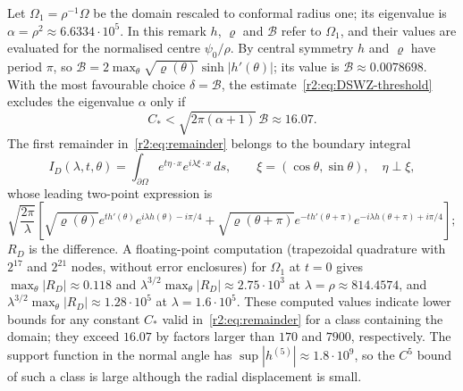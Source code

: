 \begin{remark}\label{r2:rem:stationary}
Let $\Omega_1=\rho^{-1}\Omega$ be the domain rescaled to conformal radius one; its eigenvalue is $\alpha=\rho^2\approx6.6334\cdot10^5$. In this remark $h$, $\varrho$ and $\mathcal B$ refer to $\Omega_1$, and their values are evaluated for the normalised centre $\psi_0/\rho$. By central symmetry $h$ and $\varrho$ have period $\pi$, so $\mathcal B=2\max_\theta\sqrt{\varrho(\theta)}\sinh|h'(\theta)|$; its value is $\mathcal B\approx0.0078698$. With the most favourable choice $\delta=\mathcal B$, the estimate~\eqref{r2:eq:DSWZ-threshold} excludes the eigenvalue $\alpha$ only if
\[
 C_*<\sqrt{2\pi(\alpha+1)}\,\mathcal B\approx16.07.
\]
The first remainder in~\eqref{r2:eq:remainder} belongs to the boundary integral
\[
 I_D(\lambda,t,\theta)
 =\int_{\partial\Omega}e^{t\eta\cdot x}e^{i\lambda\xi\cdot x}\,ds,
 \qquad\xi=(\cos\theta,\sin\theta),\quad\eta\perp\xi,
\]
whose leading two-point expression is
\[
 \sqrt{\frac{2\pi}{\lambda}}\left[
 \sqrt{\varrho(\theta)}e^{t h'(\theta)}e^{i\lambda h(\theta)-i\pi/4}
 +\sqrt{\varrho(\theta+\pi)}e^{-t h'(\theta+\pi)}
 e^{-i\lambda h(\theta+\pi)+i\pi/4}\right];
\]
$R_D$ is the difference. A floating-point computation (trapezoidal quadrature with $2^{17}$ and $2^{21}$ nodes, without error enclosures) for $\Omega_1$ at $t=0$ gives $\max_\theta|R_D|\approx0.118$ and $\lambda^{3/2}\max_\theta|R_D|\approx2.75\cdot10^3$ at $\lambda=\rho\approx814.4574$, and $\lambda^{3/2}\max_\theta|R_D|\approx1.28\cdot10^5$ at $\lambda=1.6\cdot10^5$. These computed values indicate lower bounds for any constant $C_*$ valid in~\eqref{r2:eq:remainder} for a class containing the domain; they exceed $16.07$ by factors larger than $170$ and $7900$, respectively. The support function in the normal angle has $\sup|h^{(5)}|\approx1.8\cdot10^9$, so the $C^5$ bound of such a class is large although the radial displacement is small.


\end{remark}
